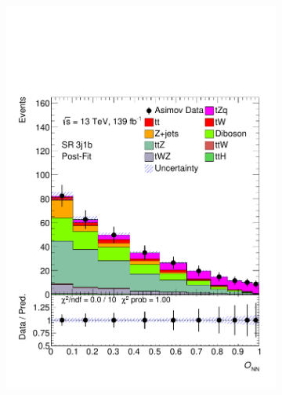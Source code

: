 \begin{figure}[!h]
\begin{subfigure}[b]{0.33\linewidth}
    \includegraphics[width=\textwidth]{ubonn-thesis/Chapters/Chapters_07/Figure/Asmiov/SR_3j1b_postFit.pdf} 
  \end{subfigure}%
  \begin{subfigure}[b]{0.33\linewidth}
    \centering

\end{subfigure}
\end{figure}
